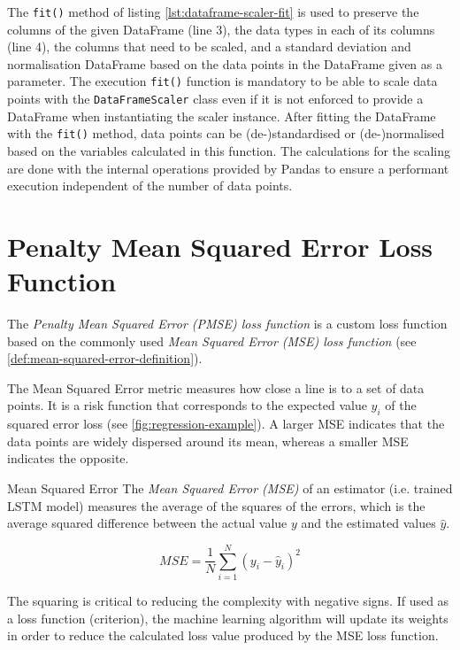     
    The \texttt{fit()} method of listing \ref{lst:dataframe-scaler-fit} is used to preserve the columns of the given DataFrame (line 3), the data types in each of its columns (line 4), the columns that need to be scaled, and a standard deviation and normalisation DataFrame based on the data points in the DataFrame given as a parameter. The execution \texttt{fit()} function is mandatory to be able to scale data points with the \texttt{DataFrameScaler} class even if it is not enforced to provide a DataFrame when instantiating the scaler instance.
    After fitting the DataFrame with the \texttt{fit()} method, data points can be (de-)standardised or (de-)normalised based on the variables calculated in this function.
    The calculations for the scaling are done with the internal operations provided by Pandas to ensure a performant execution independent of the number of data points.


  \section{Penalty Mean Squared Error Loss Function}
  \label{sec:penalty-mse-loss-function-architecture-and-implementation}

    The \emph{Penalty Mean Squared Error (PMSE) loss function} is a custom loss function based on the commonly used \emph{Mean Squared Error (MSE) loss function} \cite{koksoyMultiresponseRobustDesign2006} (see \ref{def:mean-squared-error-definition}). 
    
    The Mean Squared Error metric measures how close a  line is to a set of data points. It is a risk function that corresponds to the expected value $y_i$ of the squared error loss (see \ref{fig:regression-example}). A larger MSE indicates that the data points are widely dispersed around its mean, whereas a smaller MSE indicates the opposite.

    \begin{pabox}{Mean Squared Error}
    \label{def:mean-squared-error-definition}
      The \emph{Mean Squared Error (MSE)} of an estimator (i.e. trained LSTM model) measures the average of the squares of the errors, which is the average squared difference between the actual value $y$ and the estimated values $\hat{y}$.

      $$MSE = \frac{1}{N} \sum_{i = 1}^{N}\left(y_i - \hat{y}_i\right)^2$$

      The squaring is critical to reducing the complexity with negative signs. If used as a loss function (criterion), the machine learning algorithm will update its weights in order to reduce the calculated loss value produced by the MSE loss function.
    \end{pabox}

